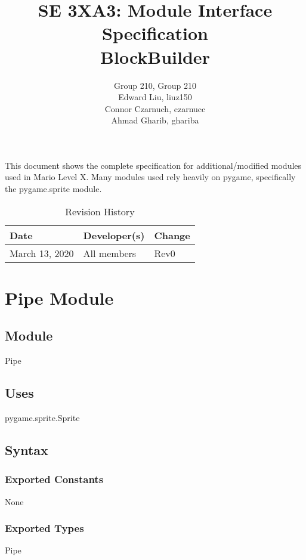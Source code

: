 \documentclass[12pt]{article}
\title{SE 3XA3: Module Interface Specification\\BlockBuilder}
\author{Group 210, Group 210
		\\ Edward Liu, liuz150
		\\ Connor Czarnuch, czarnucc
		\\ Ahmad Gharib, ghariba
}
\begin{document}
 
\maketitle

\noindent This document shows the complete specification for additional/modified modules used in Mario Level X. Many modules used rely heavily on pygame, specifically the pygame.sprite module.

\begin{table}[hp]
\caption{Revision History} \label{TblRevisionHistory}
\begin{tabularx}{\textwidth}{llX}
\toprule
\textbf{Date} & \textbf{Developer(s)} & \textbf{Change}\\
\midrule
March 13, 2020 & All members & Rev0\\
\bottomrule
\end{tabularx}
\end{table}

\newpage

\section* {Pipe Module}

\subsection*{Module}

Pipe

\subsection* {Uses}

pygame.sprite.Sprite

\subsection* {Syntax}

\subsubsection* {Exported Constants}

None

\subsubsection* {Exported Types}

Pipe
\end{document}
